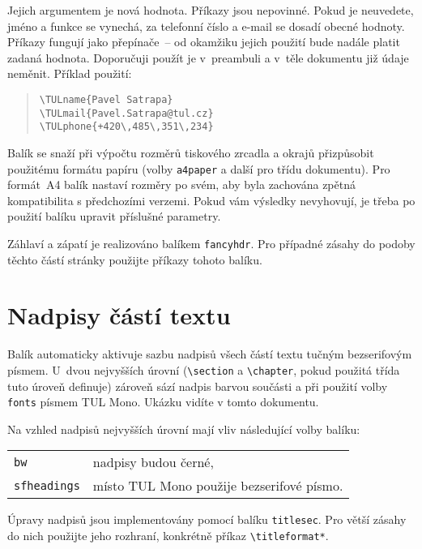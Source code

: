 \documentclass[a4paper,12pt,fonts,numbering]{./tulpackage/tularticle}
\newcommand{\cmdfont}[1]{\texttt{\color{\tulcolor}#1}}
\newcommand{\cmdnoindex}[1]{\cmdfont{\textbackslash #1}}
\begin{document}
Jejich argumentem je nová hodnota. Příkazy jsou nepovinné. Pokud je neuvedete,
jméno a funkce se vynechá, za telefonní číslo a e-mail se dosadí obecné
hodnoty. Příkazy fungují jako přepínače~-- od okamžiku jejich použití bude
nadále platit zadaná hodnota. Doporučuji použít je v~preambuli a v~těle
dokumentu již údaje neměnit. Příklad použití:

\begin{quote}
\cmdnoindex{TULname\{Pavel Satrapa\}}\\
\cmdnoindex{TULmail\{Pavel.Satrapa@tul.cz\}}\\
\cmdnoindex{TULphone\{+420\textbackslash ,485\textbackslash ,351\textbackslash ,234\}}
\end{quote}

Balík se snaží při výpočtu rozměrů tiskového zrcadla a okrajů přizpůsobit
použitému formátu papíru (volby \cmdfont{a4paper} a další pro třídu dokumentu).
Pro formát~A4 balík nastaví rozměry po svém, aby byla zachována zpětná
kompatibilita s předchozími verzemi. Pokud vám výsledky nevyhovují, je třeba po
použití balíku upravit příslušné parametry.

Záhlaví a zápatí je realizováno balíkem \cmdfont{fancyhdr}. Pro případné zásahy
do podoby těchto částí stránky použijte příkazy tohoto balíku.

\clearpage

\section{Nadpisy částí textu}

Balík automaticky aktivuje sazbu nadpisů všech částí textu tučným bezserifovým
písmem. U~dvou nejvyšších úrovní (\cmdnoindex{section} a \cmdnoindex{chapter},
pokud použitá třída tuto úroveň definuje) zároveň sází nadpis barvou součásti a
při použití volby \cmdfont{fonts} písmem TUL Mono. Ukázku vidíte v tomto
dokumentu.

Na vzhled nadpisů nejvyšších úrovní mají vliv následující volby balíku:

\begin{tabularx}{\textwidth}{@{}lX}
\cmdfont{bw} & nadpisy budou černé,\\
\cmdfont{sfheadings} & místo TUL Mono použije bezserifové písmo.\\
\end{tabularx}

Úpravy nadpisů jsou implementovány pomocí balíku \cmdfont{titlesec}. Pro větší
zásahy do nich použijte jeho rozhraní, konkrétně příkaz
\cmdnoindex{titleformat*}.
\end{document}
